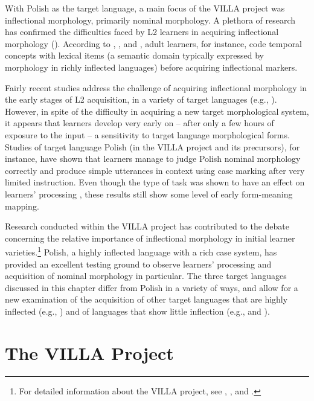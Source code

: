 \documentclass[output=paper,colorlinks,citecolor=brown,modfonts,nonflat]{../langscibook}
\begin{document}
With Polish as the target language, a main focus of the VILLA project was inflectional morphology, primarily nominal morphology. A plethora of research has confirmed the difficulties faced by L2 learners in acquiring inflectional morphology (\citealt{Bardovi-Harlig2000, Larsen-Freeman2010}). According to \citet{Meisel1987}, \cite{Bardovi-Harlig1992}, \cite{KleinPerdue1997} and \citet{Starren2001}, adult learners, for instance, code temporal concepts with lexical items (a semantic domain typically expressed by morphology in richly inflected languages) before acquiring inflectional markers.

Fairly recent studies address the challenge of acquiring inflectional morphology in the early stages of L2 acquisition, in a variety of target languages (e.g., \citealt{CarrollWidjaja2013,HanLiu2013,HinzEtAl2013,RastEtAl2014}). However, in spite of the difficulty in acquiring a new target morphological system, it appears that learners develop very early on – after only a few hours of exposure to the input – a sensitivity to target language morphological forms. Studies of target language Polish (in the VILLA project and its precursors), for instance, have shown that learners manage to judge Polish nominal morphology correctly and produce simple utterances in context using case marking after very limited instruction. Even though the type of task was shown to have an effect on learners’ processing \citep{WatorekEtAl2016}, these results still show some level of early form-meaning mapping.

Research conducted within the VILLA project has contributed to the debate concerning the relative importance of inflectional morphology in initial learner varieties.\footnote{{For detailed information about the VILLA project, see \cite{DimrothEtAl2013}, \cite{Rast2017}, and \cite{Saturno2017}.}} Polish, a highly inflected language with a rich case system, has provided an excellent testing ground to observe learners’ processing and acquisition of nominal morphology in particular. The three target languages discussed in this chapter differ from Polish in a variety of ways, and allow for a new examination of the acquisition of other target languages that are highly inflected (e.g., ) and of languages that show little inflection (e.g.,  and ).

\section{The VILLA Project}\label{sec:watorek:3}
\end{document}
